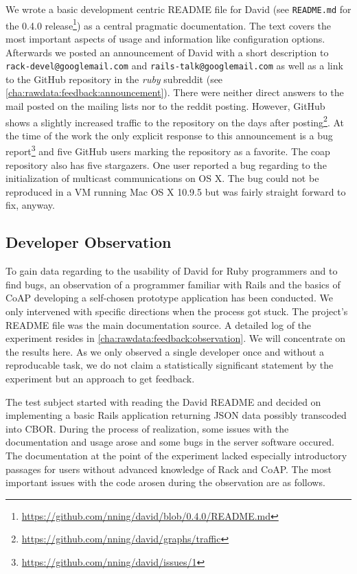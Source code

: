 		We wrote a basic development centric README file for David (see
		\texttt{README.md} for the 0.4.0
		release\footnote{\url{https://github.com/nning/david/blob/0.4.0/README.md}})
		as a central pragmatic documentation. The text covers the most
		important aspects of usage and information like configuration options.
		Afterwards we posted an announcement of David with a short description
		to \texttt{rack-devel@googlemail.com} and
		\texttt{rails-talk@googlemail.com} as well as a link to the GitHub
		repository in the \emph{ruby} subreddit (see
		\autoref{cha:rawdata:feedback:announcement}). There were neither direct
		answers to the mail posted on the mailing lists nor to the reddit
		posting. However, GitHub shows a slightly increased traffic to the
		repository on the days after
		posting\footnote{\url{https://github.com/nning/david/graphs/traffic}}.
		At the time of the work the only explicit response to this announcement
		is a bug report\footnote{\url{https://github.com/nning/david/issues/1}}
		and five GitHub users marking the repository as a favorite. The coap
		repository also has five stargazers. One user reported a bug regarding
		to the initialization of multicast communications on OS X. The bug
		could not be reproduced in a \ac{VM} running Mac OS X 10.9.5 but was
		fairly straight forward to fix, anyway.

	\subsection{Developer Observation}

		To gain data regarding to the usability of David for Ruby programmers
		and to find bugs, an observation of a programmer familiar with
		\ac{Rails} and the basics of \ac{CoAP} developing a self-chosen
		prototype application has been conducted. We only intervened with
		specific directions when the process got stuck. The project's README
		file was the main documentation source. A detailed log of the
		experiment resides in \autoref{cha:rawdata:feedback:observation}. We
		will concentrate on the results here. As we only observed a single
		developer once and without a reproducable task, we do not claim a
		statistically significant statement by the experiment but an approach
		to get feedback.

		The test subject started with reading the David README and decided on
		implementing a basic \ac{Rails} application returning \ac{JSON} data
		possibly transcoded into \ac{CBOR}. During the process of realization,
		some issues with the documentation and usage arose and some bugs in the
		server software occured. The documentation at the point of the
		experiment lacked especially introductory passages for users without
		advanced knowledge of Rack and \ac{CoAP}. The most important issues
		with the code arosen during the observation are as follows.


